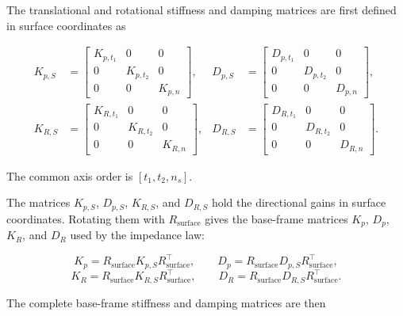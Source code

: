 The translational and rotational stiffness and damping matrices are first
defined in surface coordinates as

\begin{align}
K_{p,S}
&=
\begin{bmatrix}
K_{p,t_1} & 0 & 0\\
0 & K_{p,t_2} & 0\\
0 & 0 & K_{p,n}
\end{bmatrix},
&
D_{p,S}
&=
\begin{bmatrix}
D_{p,t_1} & 0 & 0\\
0 & D_{p,t_2} & 0\\
0 & 0 & D_{p,n}
\end{bmatrix},
\label{eq:surface_gain_blocks_translational}
\\[1.2ex]
K_{R,S}
&=
\begin{bmatrix}
K_{R,t_1} & 0 & 0\\
0 & K_{R,t_2} & 0\\
0 & 0 & K_{R,n}
\end{bmatrix},
&
D_{R,S}
&=
\begin{bmatrix}
D_{R,t_1} & 0 & 0\\
0 & D_{R,t_2} & 0\\
0 & 0 & D_{R,n}
\end{bmatrix}.
\label{eq:full_task_frame_gain_blocks}
\end{align}

The common axis order is \mbox{\([t_1,t_2,n_s]\)}.

The matrices \mbox{\(K_{p,S}\)}, \mbox{\(D_{p,S}\)},
\mbox{\(K_{R,S}\)}, and \mbox{\(D_{R,S}\)} hold the directional gains in
surface coordinates. Rotating them with \mbox{\(R_{\mathrm{surface}}\)}
gives the base-frame matrices \mbox{\(K_p\)}, \mbox{\(D_p\)},
\mbox{\(K_R\)}, and \mbox{\(D_R\)} used by the impedance law:

\begin{equation}
K_p
=
R_{\mathrm{surface}}K_{p,S}R_{\mathrm{surface}}^\top,
\qquad
D_p
=
R_{\mathrm{surface}}D_{p,S}R_{\mathrm{surface}}^\top,
\label{eq:spatial_gain_matrix}
\end{equation}
\begin{equation}
K_R
=
R_{\mathrm{surface}}K_{R,S}R_{\mathrm{surface}}^\top,
\qquad
D_R
=
R_{\mathrm{surface}}D_{R,S}R_{\mathrm{surface}}^\top.
\label{eq:general_task_frame_gain_transform}
\end{equation}

The complete base-frame stiffness and damping matrices are then

